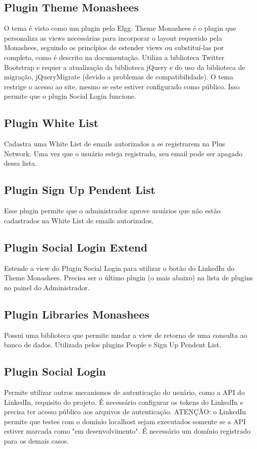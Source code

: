 \documentclass[12pt, letterpaper, onecolumn]{article}
\begin{document}
\subsection{Plugin Theme Monashees}
O tema é visto como um plugin pelo Elgg. Theme Monashees é o plugin que personaliza as views necessárias para incorporar o layout requerido pela Monashees, seguindo os princípios de estender views ou substituí-las por completo, como é descrito na documentação. Utiliza a biblioteca Twitter Bootstrap e requer a atualização da biblioteca jQuery e do uso da biblioteca de migração, jQueryMigrate (devido a problemas de compatibilidade). O tema restrige o acesso ao site, mesmo se este estiver configurado como público. Isso permite que o plugin Social Login funcione.

\subsection{Plugin White List}
Cadastra uma White List de emails autorizados a se registrarem na Plus Network. Uma vez que o usuário esteja registrado, seu email pode ser apagado dessa lista.

\subsection{Plugin Sign Up Pendent List}
Esse plugin permite que o administrador aprove usuários que não estão cadastrados na White List de emails autorizados.

\subsection{Plugin Social Login Extend}
Estende a view do Plugin Social Login para utilizar  o botão do LinkedIn do Theme Monashees. Precisa ser o último plugin (o mais abaixo) na lista de plugins no painel do Administrador.

\subsection{Plugin Libraries Monashees}
Possui uma biblioteca que permite mudar a view de retorno de uma consulta ao banco de dados. Utilizada pelos plugins People e Sign Up Pendent List.

\subsection{Plugin Social Login}
Permite utilizar outros mecanismos de autenticação do usuário, como a API do LinkedIn, requisito do projeto. É necessário configurar os tokens do LinkedIn e precisa ter acesso público aos arquivos de autenticação. ATENÇÃO: o LinkedIn permite que testes com o domínio localhost sejam executados somente se a API estiver marcada como "em desenvolvimento". É necessário um domínio registrado para os demais casos.
\end{document}
